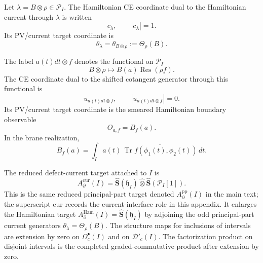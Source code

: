 \begin{defn}
\label{def:app-factorization-current-coordinates}
  Let \(\lambda=B\otimes\rho\in\mathcal P_I\).  The Hamiltonian CE
  coordinate dual to the Hamiltonian current through \(\lambda\) is
  written
  \[
    c_\lambda,\qquad |c_\lambda|=1 .
  \]
  Its PV/current target coordinate is
  \[
    \theta_\lambda=\theta_{B\otimes\rho}:=\Theta_\rho(B).
  \]

  The label \(a(t)dt\otimes f\) denotes the functional on
  \(\mathcal P_I\)
  \[
    B\otimes\rho\longmapsto B(a)\operatorname{Res}(\rho f).
  \]
  The CE coordinate dual to the shifted cotangent generator through this
  functional is
  \[
    u_{a(t)dt\otimes f},\qquad |u_{a(t)dt\otimes f}|=0.
  \]
  Its PV/current target coordinate is the smeared Hamiltonian boundary
  observable
  \[
    O_{a,f}=B_f(a).
  \]
  In the brane realization,
  \[
    B_f(a)=
      \int_I a(t)\,
      \overline{\operatorname{Tr}f(\phi_1(t),\phi_2(t))}\,dt .
  \]
\end{defn}

\begin{defn}
\label{def:app-factorization-enlarged-current-target}
  The reduced defect-current target attached to \(I\) is
  \[
    A_\partial^{\mathrm{cur}}(I)
      =
      \widehat{\mathbf S}(\mathfrak h_I)
      \widehat\otimes
      \widehat{\mathbf S}(\mathcal P_I[1]).
  \]
  This is the same reduced principal-part target denoted
  \(A_\partial^{\mathrm{pp}}(I)\) in the main text; the superscript
  \(\mathrm{cur}\) records the current-interface role in this appendix.
  It enlarges the Hamiltonian target
  \(A_\partial^{\mathrm{Ham}}(I)=\widehat{\mathbf S}(\mathfrak h_I)\)
  by adjoining the odd principal-part current generators
  \(\theta_\lambda=\Theta_\rho(B)\).  The structure maps for
  inclusions of intervals are extension by zero on
  \(\Omega^\bullet_c(I)\) and on \(\mathcal D'_c(I)\).  The
  factorization product on disjoint intervals is the completed
  graded-commutative product after extension by zero.
\end{defn}

